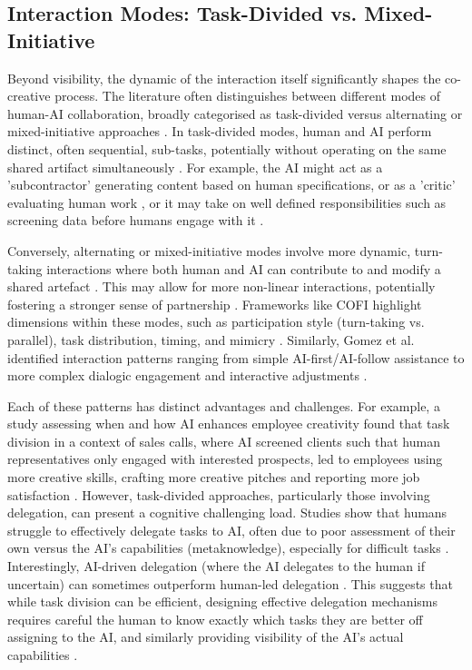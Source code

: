 \subsection{Interaction Modes: Task-Divided vs. Mixed-Initiative}

Beyond visibility, the dynamic of the interaction itself significantly shapes the co-creative process. The literature often distinguishes between different modes of human-AI collaboration, broadly categorised as task-divided versus alternating or mixed-initiative approaches \cite{Kantosalo2020-nh, Kantosalo2016-nm}. In task-divided modes, human and AI perform distinct, often sequential, sub-tasks, potentially without operating on the same shared artifact simultaneously \cite{Kantosalo2016-nm}. For example, the AI might act as a 'subcontractor' generating content based on human specifications, or as a 'critic' evaluating human work \cite{Lin2023-zq}, or it may take on well defined responsibilities such as screening data before humans engage with it \cite{Jia2024-vp}. 

Conversely, alternating or mixed-initiative modes involve more dynamic, turn-taking interactions where both human and AI can contribute to and modify a shared artefact \cite{Kantosalo2020-nh, Kantosalo2016-nm, Lin2023-zq}. This may allow for more non-linear interactions, potentially fostering a stronger sense of partnership \cite{Davis2016-te, Zhou2024-vp}. Frameworks like COFI highlight dimensions within these modes, such as participation style (turn-taking vs. parallel), task distribution, timing, and mimicry \cite{Rezwana2022-gg}. Similarly, Gomez et al. identified interaction patterns ranging from simple AI-first/AI-follow assistance to more complex dialogic engagement and interactive adjustments \cite{Gomez2023-bp}.

Each of these patterns has distinct advantages and challenges. For example, a study assessing when and how AI enhances employee creativity found that task division in a context of sales calls, where AI screened clients such that human representatives only engaged with interested prospects, led to employees using more creative skills, crafting more creative pitches and reporting more job satisfaction \cite{Jia2024-vp}. However, task-divided approaches, particularly those involving delegation, can present a cognitive challenging load. Studies show that humans struggle to effectively delegate tasks to AI, often due to poor assessment of their own versus the AI's capabilities (metaknowledge), especially for difficult tasks \cite{Fugener2019-yz}. Interestingly, AI-driven delegation (where the AI delegates to the human if uncertain) can sometimes outperform human-led delegation \cite{Fugener2019-yz}. This suggests that while task division can be efficient, designing effective delegation mechanisms requires careful the human to know exactly which tasks they are better off assigning to the AI, and similarly providing visibility of the AI's actual capabilities \cite{Dell-Acqua2022-dy, Fugener2019-yz}.

